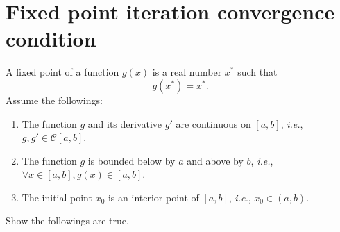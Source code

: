 \section{Fixed point iteration convergence condition}
A fixed point of a function \(g(x)\) is a real number \(x^*\) such that
\[ g(x^*)=x^*. \]
Assume the followings:
\begin{enumerate}
	\item The function $g$ and its derivative $g'$ are continuous on \([a, b]\), \textit{i.e.}, \(g,g'\in\mathcal{C}[a,b]\).
	\item The function $g$ is bounded below by $a$ and above by $b$, \textit{i.e.}, \(\forall x\in[a,b],g(x)\in[a, b]\).
	\item The initial point \(x_0\) is an interior point of \([a,b]\), \textit{i.e.}, \(x_0\in(a, b)\).
\end{enumerate}
Show the followings are true.

